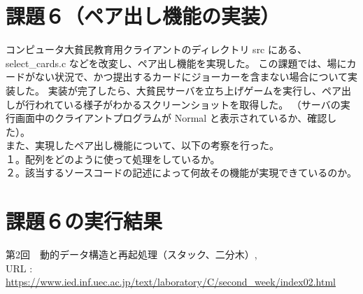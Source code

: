 \documentclass[]{jsarticle}
\begin{document}
\newpage
\section*{課題６（ペア出し機能の実装）}
コンピュータ大貧民教育用クライアントのディレクトリ src にある、select\_cards.c などを改変し、ペア出し機能を実現した。
この課題では、場にカードがない状況で、かつ提出するカードにジョーカーを含まない場合について実装した。
実装が完了したら、大貧民サーバを立ち上げゲームを実行し、ペア出しが行われている様子がわかるスクリーンショットを取得した。
（サーバの実行画面中のクライアントプログラムが Normal と表示されているか、確認した）。\\

\noindent また、実現したペア出し機能について、以下の考察を行った。\\
１。配列をどのように使って処理をしているか。\\
２。該当するソースコードの記述によって何故その機能が実現できているのか。\\

\section*{課題６の実行結果}



\newpage
\begin{thebibliography}{99}
   第2回　動的データ構造と再起処理（スタック、二分木）, \\URL : \url{https://www.ied.inf.uec.ac.jp/text/laboratory/C/second_week/index02.html}
\end{thebibliography}
\end{document}
